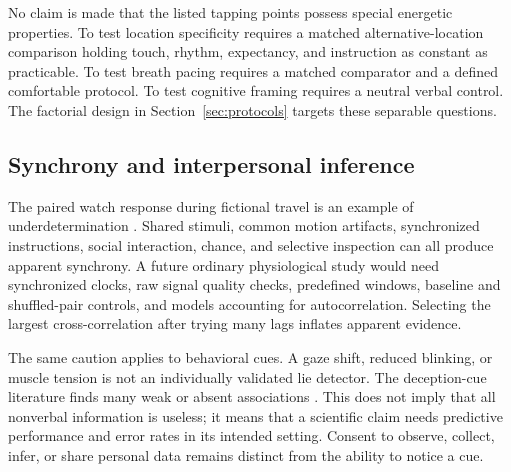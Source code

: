 No claim is made that the listed tapping points possess special energetic properties. To test location specificity requires a matched alternative-location comparison holding touch, rhythm, expectancy, and instruction as constant as practicable. To test breath pacing requires a matched comparator and a defined comfortable protocol. To test cognitive framing requires a neutral verbal control. The factorial design in Section~\ref{sec:protocols} targets these separable questions.

\subsection{Synchrony and interpersonal inference}
The paired watch response during fictional travel is an example of underdetermination . Shared stimuli, common motion artifacts, synchronized instructions, social interaction, chance, and selective inspection can all produce apparent synchrony. A future ordinary physiological study would need synchronized clocks, raw signal quality checks, predefined windows, baseline and shuffled-pair controls, and models accounting for autocorrelation. Selecting the largest cross-correlation after trying many lags inflates apparent evidence.

The same caution applies to behavioral cues. A gaze shift, reduced blinking, or muscle tension is not an individually validated lie detector. The deception-cue literature finds many weak or absent associations \cite{depaulo}. This does not imply that all nonverbal information is useless; it means that a scientific claim needs predictive performance and error rates in its intended setting. Consent to observe, collect, infer, or share personal data remains distinct from the ability to notice a cue.

